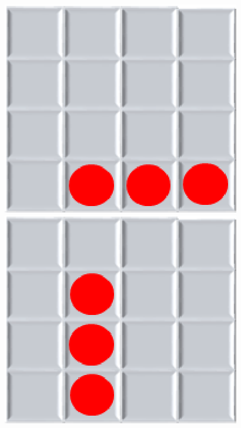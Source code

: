 \begin{figure}[h]
	\centering
	\begin{minipage}[t]{0.3\linewidth}
		\centering
		\includegraphics[scale=0.5]{contenido/cap4/imagenes/posibilidadesConecta3_01b.eps}
	\end{minipage}
	\begin{minipage}[t]{0.3\linewidth}
		\centering
		\includegraphics[scale=0.5]{contenido/cap4/imagenes/posibilidadesConecta3_03b.eps}
	\end{minipage}
	\begin{minipage}[t]{0.3\linewidth}
		\centering

\end{minipage}
\end{figure}
